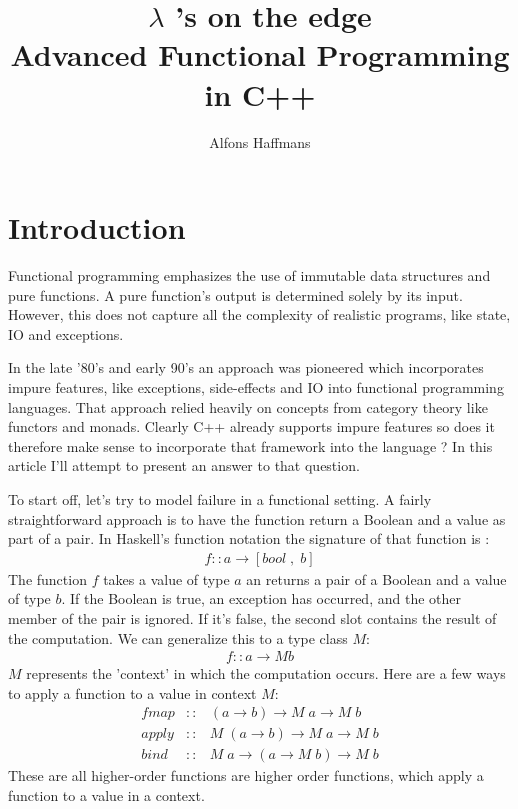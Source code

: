 \documentclass[12pt,fleqn]{article}
\begin{document}
\title{$\lambda$ 's on the edge \\ Advanced Functional Programming in C++}
\author {Alfons Haffmans}
\maketitle
\section* {Introduction}

  
Functional programming emphasizes the use of immutable data structures and pure functions.
A pure function's output is determined solely by its input.
However, this does not capture all the complexity of realistic programs, like state, IO and exceptions. 

In the late '80's and early 90's an approach was pioneered which incorporates impure features, like exceptions, side-effects and IO
into functional programming languages. 
That approach relied heavily on concepts from category theory like functors and monads.
Clearly C++ already supports impure features so does it therefore make sense to incorporate that framework into the language ?
In this article I'll attempt to present an answer to that question.

To start off, let's try to model failure in a functional setting.
A fairly straightforward approach is to have the function return a Boolean and a value as part of a pair.
In Haskell's function notation the signature of that function is :
\begin{eqnarray*}
f :: a \rightarrow [ bool \;,\; b ]
\end{eqnarray*}
The function $f$ takes a value of type $a$ an returns a pair of a Boolean and a value of type $b$.
If the Boolean is true, an exception has occurred, and the other member of the pair is ignored.
If it's false, the second slot contains the result of the computation.
We can generalize this to a type class $M$:
\begin{eqnarray*}
f :: a \rightarrow M b
\end{eqnarray*}
$M$ represents the 'context' in which the computation occurs.
Here are a few ways to apply a function to a value in context $M$:
\begin{eqnarray*}
fmap  &::& (a \rightarrow b) \rightarrow M\;a \rightarrow M \;b \\
apply &::& M \; (a \rightarrow b) \rightarrow M\;a \rightarrow M \;b \\
bind  &::& M \; a \rightarrow (a \rightarrow M\; b) \rightarrow M \; b
\end{eqnarray*}
These are all higher-order functions are higher order functions, which apply a function to a value in a context.
\end{document}
